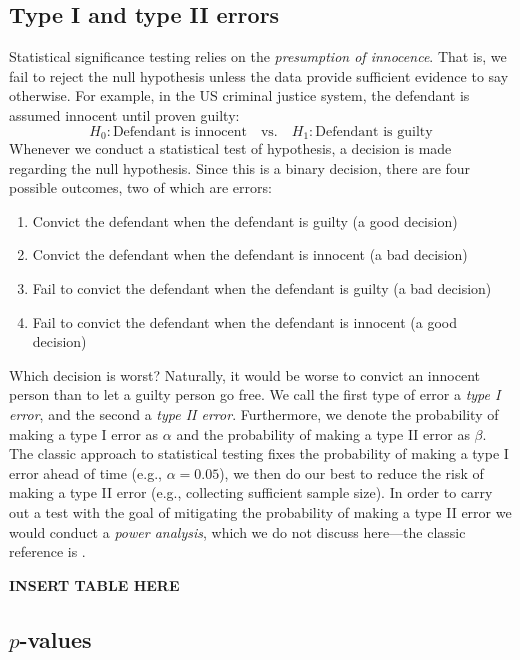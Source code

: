 \documentclass[]{book}
\theoremstyle{definition}
\theoremstyle{definition}
\theoremstyle{definition}
\theoremstyle{remark}
\begin{document}
\hypertarget{type-i-and-type-ii-errors}{%
\subsection{Type I and type II errors}\label{type-i-and-type-ii-errors}}

Statistical significance testing relies on the \emph{presumption of
innocence}. That is, we fail to reject the null hypothesis unless the
data provide sufficient evidence to say otherwise. For example, in the
US criminal justice system, the defendant is assumed innocent until
proven guilty: \[
H_0: \text{Defendant is innocent} \quad \text{vs.} \quad H_1: \text{Defendant is guilty}
\] Whenever we conduct a statistical test of hypothesis, a decision is
made regarding the null hypothesis. Since this is a binary decision,
there are four possible outcomes, two of which are errors:

\begin{enumerate}
\def\labelenumi{\arabic{enumi}.}
\item
  Convict the defendant when the defendant is guilty (a good decision)
\item
  Convict the defendant when the defendant is innocent (a bad decision)
\item
  Fail to convict the defendant when the defendant is guilty (a bad
  decision)
\item
  Fail to convict the defendant when the defendant is innocent (a good
  decision)
\end{enumerate}

Which decision is worst? Naturally, it would be worse to convict an
innocent person than to let a guilty person go free. We call the first
type of error a \emph{type I error}, and the second a \emph{type II
error}. Furthermore, we denote the probability of making a type I error
as \(\alpha\) and the probability of making a type II error as
\(\beta\). The classic approach to statistical testing fixes the
probability of making a type I error ahead of time (e.g.,
\(\alpha = 0.05\)), we then do our best to reduce the risk of making a
type II error (e.g., collecting sufficient sample size). In order to
carry out a test with the goal of mitigating the probability of making a
type II error we would conduct a \emph{power analysis}, which we do not
discuss here---the classic reference is \citet{cohen-statistical-1988}.

\textbf{INSERT TABLE HERE}

\hypertarget{p-values}{%
\subsection{\texorpdfstring{\(p\)-values}{p-values}}\label{p-values}}
\end{document}
